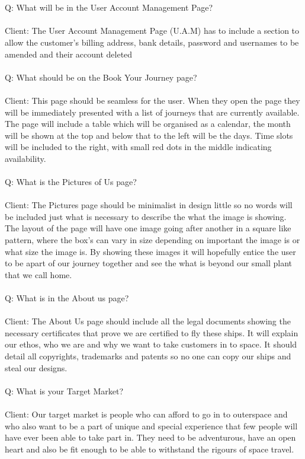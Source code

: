 \documentclass{article}
\begin{document}
\\
\\
Q: What will be in the User Account Management Page?
\\
\\
Client: The User Account Management Page (U.A.M) has to include a section to allow the customer’s billing address, bank details, password and usernames to be amended and their account deleted
\\
\\
Q: What should be on the Book Your Journey page?
\\
\\
Client: This page should be seamless for the user. When they open the page they will be immediately presented with a list of journeys that are currently available. The page will include a table which will be organised as a calendar, the month will be shown at the top and below that to the left will be the days. Time slots will be included to the right, with small red dots in the middle indicating availability. 
\\
\\
Q: What is the Pictures of Us page?
\\
\\
Client: The Pictures page should be minimalist in design little so no words will be included just what is necessary to describe the what the image is showing. The layout of the page will have one image going after another in a square like pattern, where the box's can vary in size depending on important the image is or what size the image is. By showing these images it will hopefully entice the user to be apart of our journey together and see the what is beyond our small plant that we call home.
\\
\\
Q: What is in the About us page?
\\
\\
Client: The About Us page should include all the legal documents showing the necessary certificates that prove we are certified to fly these ships. It will explain our ethos, who we are and why we want to take customers in to space. It should detail all copyrights, trademarks and patents so no one can
copy our ships and steal our designs.
\\
\\
Q: What is your Target Market?
\\
\\
Client: Our target market is people who can afford to go in to outerspace and who also want to be a part of unique and special experience that few people will have ever been able to take part in. They need to be adventurous, have an open heart and also be fit enough to be able to withstand the rigours of space travel.
\end{document}

